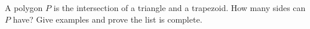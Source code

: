 A polygon $P$ is the intersection of a triangle and a trapezoid. How many sides can $P$ have? Give examples and prove the list is complete.
